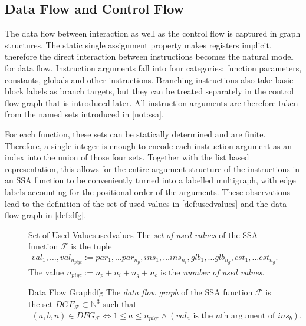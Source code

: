 \subsection{Data Flow and Control Flow}

    The data flow between interaction as well as the control flow is captured in
    graph structures.
    The static single assignment property makes registers implicit, therefore
    the direct interaction between instructions becomes the natural model for
    data flow.
    Instruction arguments fall into four categories: function parameters,
    constants, globals and other instructions.
    Branching instructions also take basic block labels as branch targets,
    but they can be treated separately in the control flow graph that is
    introduced later.
    All instruction arguments are therefore taken from the named sets introduced
    in \autoref{not:ssa}.

    For each function, these sets can be statically determined and are finite.
    Therefore, a single integer is enough to encode each instruction argument as
    an index into the union of those four sets.
    Together with the list based representation, this allows for the
    entire argument structure of the instructions in an SSA function to be
    conveniently turned into a labelled multigraph, with edge labels accounting
    for the positional order of the arguments.
    These observations lead to the definition of the set of used values in
    \autoref{def:usedvalues} and the data flow graph in \autoref{def:dfg}.

\begin{figure}[h]
\begin{definition}{Set of Used Values}{usedvalues}
    The {\em set of used values} of the SSA function $\mathcal F$ is the tuple
    \begin{align*}
       val_1,\dots,val_{n_{pigc}} := par_1,\dots par_{n_p},
                                     ins_1,\dots ins_{n_i},
                                     glb_1,\dots glb_{n_g},
                                     cst_1,\dots cst_{n_g}.
    \end{align*}
    The value $n_{pigc}:=n_p+n_i+n_g+n_c$ is the {\em number of used values}.
\end{definition}

\begin{definition}{Data Flow Graph}{dfg}
    The {\em data flow graph} of the SSA function $\mathcal F$ is the set
    $DGF_{\mathcal F}\subset \mathbb N^3$ such that
    \begin{align*}
        (a,b,n)\in DFG_{\mathcal F}\iff 1\leq a\leq n_{pigc}\mathrel{\land}(val_a\text{ is the $n$th argument of }ins_b).
    \end{align*}
\end{definition}
\end{figure}


